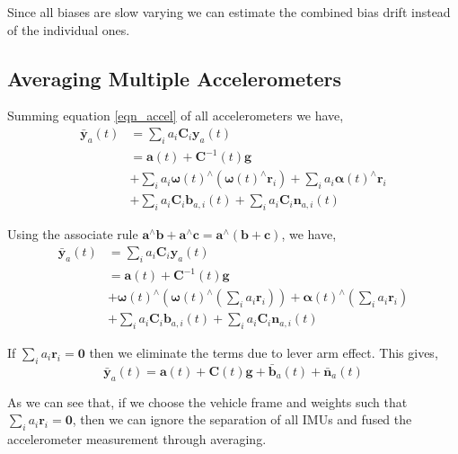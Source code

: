 \documentclass[conference]{IEEEtran}
\begin{document}
Since all biases are slow varying we can estimate the combined bias drift instead of the individual ones.

\subsection{Averaging Multiple Accelerometers}

Summing equation \ref{eqn_accel} of all accelerometers we have,
\begin{equation}
\begin{split}
    \bar{\textbf{y}}_a(t) &= \sum_i{a_i \textbf{C}_{i} \textbf{y}_a(t)} \\
    &= \textbf{a}(t) + \textbf{C}^{-1}(t)\textbf{g} \\
    &+ \sum_i{a_i \bm{\omega}(t)^\wedge (\bm{\omega}(t)^\wedge \textbf{r}_i)} + \sum_i{a_i \bm{\alpha}(t)^\wedge \textbf{r}_i} \\
    &+ \sum_i{a_i \textbf{C}_{i} \textbf{b}_{a,i}(t)} + \sum_i{a_i \textbf{C}_{i} \textbf{n}_{a,i}(t)}
\end{split}
\end{equation}

Using the associate rule $\textbf{a}^\wedge \textbf{b} + \textbf{a}^\wedge \textbf{c} = \textbf{a}^\wedge \left(\textbf{b} + \textbf{c}\right)$, we have,
\begin{equation}
\begin{split}
    \bar{\textbf{y}}_a(t) &= \sum_i{a_i \textbf{C}_{i} \textbf{y}_a(t)} \\
    &= \textbf{a}(t) + \textbf{C}^{-1}(t)\textbf{g} \\
    &+ \bm{\omega}(t)^\wedge \left(\bm{\omega}(t)^\wedge \left( \sum_i{a_i \textbf{r}_i} \right) \right) + \bm{\alpha}(t)^\wedge \left( \sum_i{a_i\textbf{r}_i} \right)\\
    &+ \sum_i{a_i \textbf{C}_{i} \textbf{b}_{a,i}(t)} + \sum_i{a_i \textbf{C}_{i} \textbf{n}_{a,i}(t)}
\end{split}
\end{equation}

If $\sum_i{a_i \textbf{r}_i} = \textbf{0}$ then we eliminate the terms due to lever arm effect. This gives,
\begin{equation}
    \bar{\textbf{y}}_a(t) = \textbf{a}(t) + \textbf{C}(t)\textbf{g} + \bar{\textbf{b}}_a(t) + \bar{\textbf{n}}_a(t)
\end{equation}

As we can see that, if we choose the vehicle frame and weights such that $\sum_i{a_i \textbf{r}_i} = \textbf{0}$, then we can ignore the separation of all IMUs and fused the accelerometer measurement through averaging.
\end{document}
